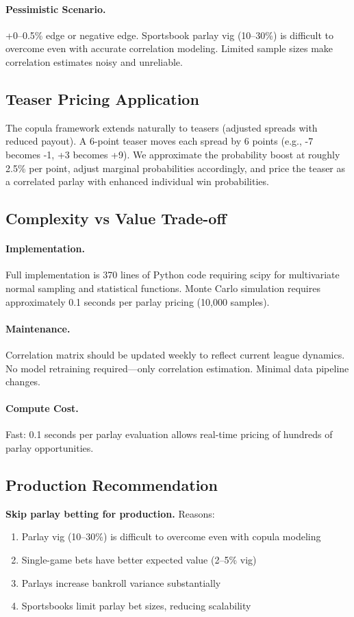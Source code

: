 \paragraph{Pessimistic Scenario.}
+0--0.5\% edge or negative edge. Sportsbook parlay vig (10--30\%) is difficult to overcome even with accurate correlation modeling. Limited sample sizes make correlation estimates noisy and unreliable.

\subsection{Teaser Pricing Application}
The copula framework extends naturally to teasers (adjusted spreads with reduced payout). A 6-point teaser moves each spread by 6 points (e.g., -7 becomes -1, +3 becomes +9). We approximate the probability boost at roughly 2.5\% per point, adjust marginal probabilities accordingly, and price the teaser as a correlated parlay with enhanced individual win probabilities.

\subsection{Complexity vs Value Trade-off}

\paragraph{Implementation.}
Full implementation is 370 lines of Python code requiring scipy for multivariate normal sampling and statistical functions. Monte Carlo simulation requires approximately 0.1 seconds per parlay pricing (10,000 samples).

\paragraph{Maintenance.}
Correlation matrix should be updated weekly to reflect current league dynamics. No model retraining required—only correlation estimation. Minimal data pipeline changes.

\paragraph{Compute Cost.}
Fast: 0.1 seconds per parlay evaluation allows real-time pricing of hundreds of parlay opportunities.

\subsection{Production Recommendation}
\textbf{Skip parlay betting for production.} Reasons:
\begin{enumerate}
  \item Parlay vig (10--30\%) is difficult to overcome even with copula modeling
  \item Single-game bets have better expected value (2--5\% vig)
  \item Parlays increase bankroll variance substantially
  \item Sportsbooks limit parlay bet sizes, reducing scalability
\end{enumerate}

